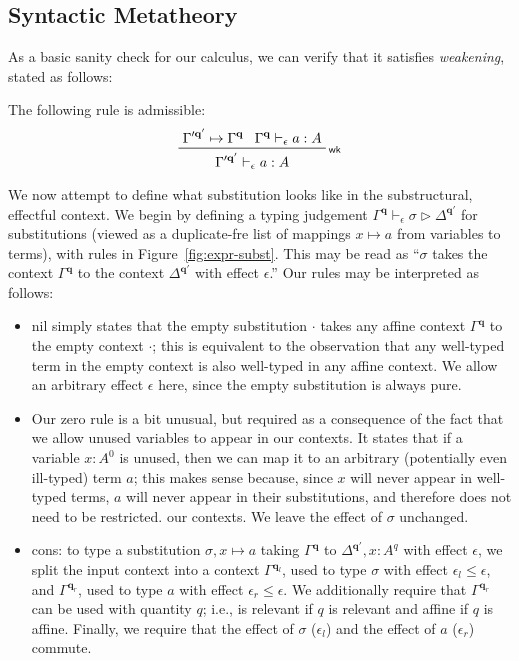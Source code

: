 \documentclass[acmsmall,screen,review]{acmart}
\newcommand{\mb}[1]{\ensuremath{\mathbf{#1}}}
\newcommand{\cwk}[2]{#1 \mapsto #2}
\newcommand{\rle}[1]{{\scriptsize\textsf{#1}}}
\newcommand{\hasty}[4]{#1 \vdash_{#2} #3: {#4}}
\newcommand{\issubst}[4]{#1 \vdash_{#2} #3 \rhd #4}
\newcommand{\brle}[1]{{\textsf{#1}}}
\begin{document}
\subsection{Syntactic Metatheory}

As a basic sanity check for our calculus, we can verify that it satisfies \emph{weakening}, stated
as follows:
\begin{lemma}[name=Weakening, restate=synmonwk]
  The following rule is admissible:
  \begin{equation*}
    \prftree[r]{\rle{wk}}
      {\cwk{\Gamma'^{\mb{q}'}}{\Gamma^{\mb{q}}}}
      {\hasty{\Gamma^{\mb{q}}}{\epsilon}{a}{A}}
      {\hasty{\Gamma'^{\mb{q}'}}{\epsilon}{a}{A}}
  \end{equation*}
\end{lemma}

We now attempt to define what substitution looks like in the substructural, effectful context. We
begin by defining a typing judgement $\issubst{\Gamma^{\mb{q}}}{\epsilon}{\sigma}{\Delta^{\mb{q}'}}$
for substitutions (viewed as a duplicate-fre list of mappings $x \mapsto a$ from variables to
terms), with rules in Figure~\ref{fig:expr-subst}. This may be read as ``$\sigma$ takes the
context $\Gamma^{\mb{q}}$ to the context $\Delta^{\mb{q}'}$ with effect $\epsilon$.'' Our rules may
be interpreted as follows:
\begin{itemize}
  \item \brle{nil} simply states that the empty substitution $\cdot$ takes any affine context
  $\Gamma^{\mb{q}}$ to the empty context $\cdot$; this is equivalent to the observation that any
  well-typed term in the empty context is also well-typed in any affine context. We allow an
  arbitrary effect $\epsilon$ here, since the empty substitution is always pure.
  \item Our \brle{zero} rule is a bit unusual, but required as a consequence of the fact that we
  allow unused variables to appear in our contexts. It states that if a variable $x : A^0$ is
  unused, then we can map it to an arbitrary (potentially even ill-typed) term $a$; this makes sense
  because, since $x$ will never appear in well-typed terms, $a$ will never appear in their
  substitutions, and therefore does not need to be restricted. our contexts. We leave the effect of
  $\sigma$ unchanged.
  \item \brle{cons}: to type a substitution $\sigma, x \mapsto a$ taking  $\Gamma^{\mb{q}}$ to
  $\Delta^{\mb{q}'}, x: A^q$ with effect $\epsilon$, we split the input context into a context
  $\Gamma^{\mb{q}_l}$, used to type $\sigma$ with effect $\epsilon_l \leq \epsilon$, and
  $\Gamma^{\mb{q}_r}$, used to type $a$ with effect $\epsilon_r \leq \epsilon$. We additionally
  require that $\Gamma^{\mb{q}_r}$ can be used with quantity $q$; i.e., is relevant if $q$ is
  relevant and affine if $q$ is affine. Finally, we require that the effect of $\sigma$
  ($\epsilon_l$) and the effect of $a$ ($\epsilon_r$) commute.
\end{itemize}
\end{document}
